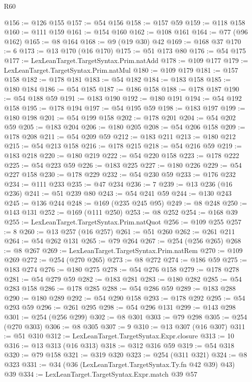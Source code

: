 \begin{lexlean}{R60}
\begin{coremodule}
@156 := @126 @155
@157 := @54 @156
@158 := @157 @59
@159 := @118 @158
@160 := @111 @159
@161 := @154 @160
@162 := @108 @161
@164 := @77 (@96 @162)
@165 := @8 @164
@168 := @9 (@19 @30) @42
@169 := @168 @37
@170 := 6
@173 := @13 @170 (@16 @170)
@175 := @51 @173 @80
@176 := @54 @175
@177 := LexLeanTarget.TargetSyntax.Prim.natAdd
@178 := @109 @177
@179 := LexLeanTarget.TargetSyntax.Prim.natMul
@180 := @109 @179
@181 := @157 @158
@182 := @178 @181
@183 := @54 @182
@184 := @183 @158
@185 := @180 @184
@186 := @54 @185
@187 := @186 @158
@188 := @178 @187
@190 := @54 @188 @59
@191 := @183 @190
@192 := @180 @191
@194 := @54 @192 @158
@195 := @178 @194
@197 := @54 @195 @59
@198 := @183 @197
@199 := @180 @198
@201 := @54 @199 @158
@202 := @178 @201
@204 := @54 @202 @59
@205 := @183 @204
@206 := @180 @205
@208 := @54 @206 @158
@209 := @178 @208
@211 := @54 @209 @59
@212 := @183 @211
@213 := @180 @212
@215 := @54 @213 @158
@216 := @178 @215
@218 := @54 @216 @59
@219 := @183 @218
@220 := @180 @219
@222 := @54 @220 @158
@223 := @178 @222
@225 := @54 @223 @59
@226 := @183 @225
@227 := @180 @226
@229 := @54 @227 @158
@230 := @178 @229
@232 := @54 @230 @59
@233 := @176 @232
@234 := @111 @233
@235 := @47 @234
@236 := 7
@239 := @13 @236 (@16 @236)
@241 := @51 @239 @80
@243 := @54 @241 @59
@244 := @130 @243
@245 := @136 @244
@248 := @169 (@235 @245 @95)
@249 := @8 @248
@250 := @143 @131
@252 := @169 (@111 @250)
@253 := @8 @252
@254 := @168 @39
@255 := LexLeanTarget.TargetSyntax.Prim.natQuot
@256 := @109 @255
@257 := 8
@260 := @13 @257 (@16 @257)
@261 := @51 @260
@262 := @261 @211
@264 := @54 @262 @131
@265 := @79 @264
@267 := @254 (@256 @265)
@268 := @8 @267
@269 := LexLeanTarget.TargetSyntax.Prim.natRem
@270 := @109 @269
@272 := @254 (@270 @265)
@273 := @8 @272
@274 := @186 @59
@275 := @183 @274
@276 := @180 @275
@278 := @54 @276 @158
@279 := @178 @278
@281 := @54 @279 @59
@282 := @183 @281
@283 := @180 @282
@285 := @54 @283 @158
@286 := @178 @285
@288 := @54 @286 @59
@289 := @183 @288
@290 := @180 @289
@292 := @54 @290 @158
@293 := @178 @292
@295 := @54 @293 @59
@296 := @261 @295
@298 := @54 @296 @131
@299 := @143 @298
@301 := @254 (@256 @299)
@302 := @8 @301
@303 := @79 @298
@305 := @254 (@270 @303)
@306 := @8 @305
@307 := 9
@310 := @13 @307 (@16 @307)
@311 := @51 @310
@312 := LexLeanTarget.TargetSyntax.Expr.closure
@313 := 10
@316 := @13 @313 (@16 @313)
@318 := @312 @316 @59
@319 := @54 @318
@320 := @79 @158
@321 := @319 @320
@323 := @254 (@311 @321)
@324 := @8 @323
@331 := @34 (@36 (LexLeanTarget.TargetSyntax.Ty.fn @42 @39) @43) @39
@334 := LexLeanTarget.TargetSyntax.Expr.match @39 @57

\end{coremodule}
\end{lexlean}
